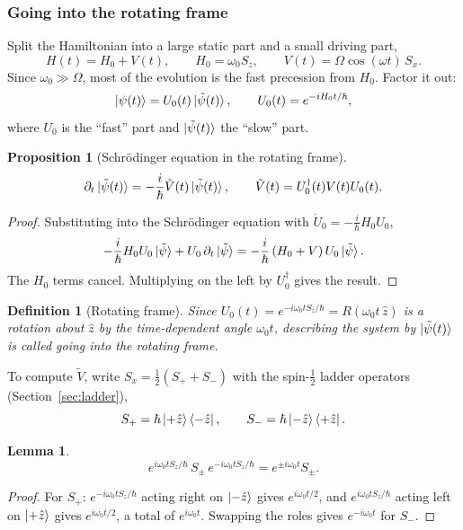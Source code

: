 \documentclass{article}
\newtheorem{lemma}[theorem]{Lemma}
\newtheorem{definition}{Definition}
\newtheorem{proposition}{Proposition}
\begin{document}
\subsubsection{Going into the rotating frame}
Split the Hamiltonian into a large static part and a small driving part,
\[H(t) = H_0 + V(t), \qquad H_0 = \omega_0S_z, \qquad V(t) = \Omega\cos(\omega t)\,S_x.\]
Since $\omega_0 \gg \Omega$, most of the evolution is the fast precession from $H_0$. Factor it out:
\begin{equation}
    \ket{\psi(t)} = U_0(t)\ket{\tilde{\psi}(t)}, \qquad U_0(t) = e^{-iH_0t/\hbar},
\end{equation}
where $U_0$ is the ``fast'' part and $\ket{\tilde{\psi}(t)}$ the ``slow'' part.
\begin{proposition}[Schr\"odinger equation in the rotating frame]
    \begin{equation}
        \partial_t\ket{\tilde{\psi}(t)} = -\frac{i}{\hbar}\tilde{V}(t)\ket{\tilde{\psi}(t)}, \qquad \tilde{V}(t) = U_0^\dagger(t)V(t)U_0(t).
    \end{equation}
\end{proposition}
\begin{proof}
    Substituting into the Schr\"odinger equation with $\dot{U}_0 = -\frac{i}{\hbar}H_0U_0$,
    \[-\frac{i}{\hbar}H_0U_0\ket{\tilde{\psi}} + U_0\,\partial_t\ket{\tilde{\psi}} = -\frac{i}{\hbar}\left(H_0 + V\right)U_0\ket{\tilde{\psi}}.\]
    The $H_0$ terms cancel. Multiplying on the left by $U_0^\dagger$ gives the result.
\end{proof}
\begin{definition}[Rotating frame]
    Since $U_0(t) = e^{-i\omega_0tS_z/\hbar} = R(\omega_0t\,\hat{z})$ is a rotation about $\hat{z}$ by the time-dependent angle $\omega_0t$, describing the system by $\ket{\tilde{\psi}(t)}$ is called going into the rotating frame.
\end{definition}
To compute $\tilde{V}$, write $S_x = \frac{1}{2}(S_+ + S_-)$ with the spin-$\tfrac12$ ladder operators (Section~\ref{sec:ladder}),
\[S_+ = \hbar\ket{+\hat{z}}\bra{-\hat{z}}, \qquad S_- = \hbar\ket{-\hat{z}}\bra{+\hat{z}}.\]
\begin{lemma}
    \begin{equation}
        e^{i\omega_0tS_z/\hbar}\,S_\pm\,e^{-i\omega_0tS_z/\hbar} = e^{\pm i\omega_0t}S_\pm.
    \end{equation}
\end{lemma}
\begin{proof}
    For $S_+$: $e^{-i\omega_0tS_z/\hbar}$ acting right on $\ket{-\hat{z}}$ gives $e^{i\omega_0t/2}$, and $e^{i\omega_0tS_z/\hbar}$ acting left on $\ket{+\hat{z}}$ gives $e^{i\omega_0t/2}$, a total of $e^{i\omega_0t}$. Swapping the roles gives $e^{-i\omega_0t}$ for $S_-$.
\end{proof}
\end{document}
